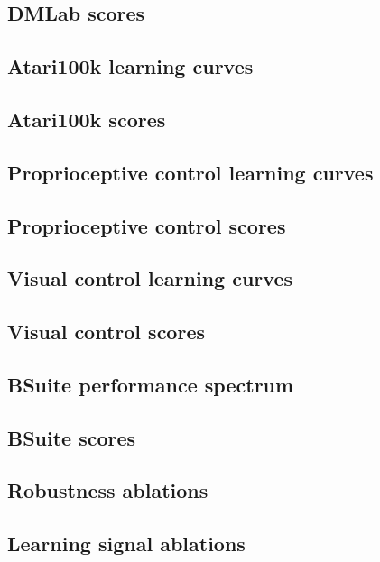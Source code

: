 \clearpage
\subsection*{DMLab scores}


\clearpage
\subsection*{Atari100k learning curves}


\clearpage
\subsection*{Atari100k scores}



\clearpage
\subsection*{Proprioceptive control learning curves}


\clearpage
\subsection*{Proprioceptive control scores}


\clearpage
\subsection*{Visual control learning curves}


\clearpage
\subsection*{Visual control scores}


\clearpage
\subsection*{BSuite performance spectrum}


\clearpage
\subsection*{BSuite scores}


\clearpage
\subsection*{Robustness ablations}


\clearpage
\subsection*{Learning signal ablations}

